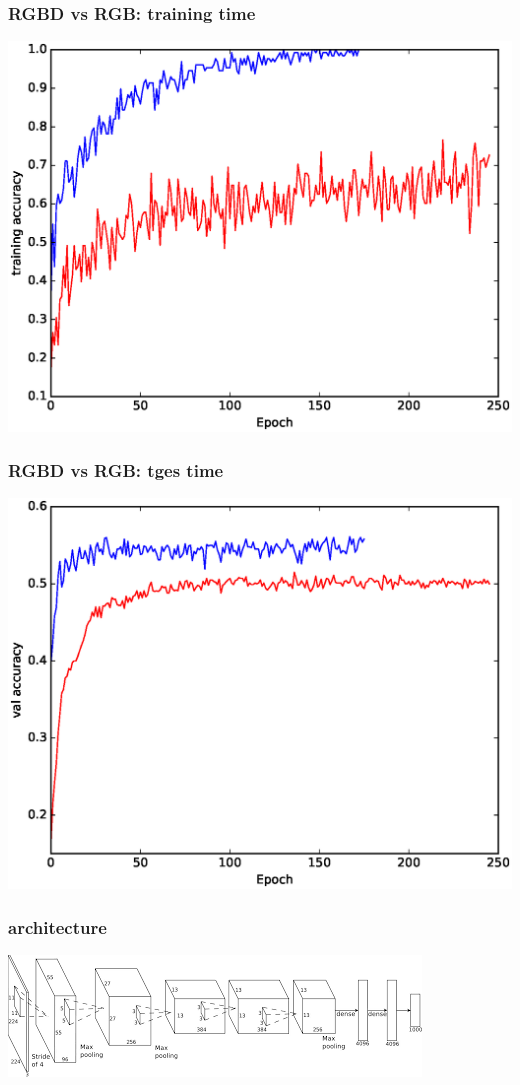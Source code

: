 \documentclass{beamer}
\begin{document}
\begin{frame}
\frametitle{RGBD vs RGB: training time}
\includegraphics[width=\linewidth]{together_train.eps}
\end{frame}


\begin{frame}
\frametitle{RGBD vs RGB: tges time}
\includegraphics[width=\linewidth]{together_test.eps}
\end{frame}

\begin{frame}
\frametitle{architecture}
\includegraphics[width=\linewidth]{alex.png}
\end{frame}
\end{document}
